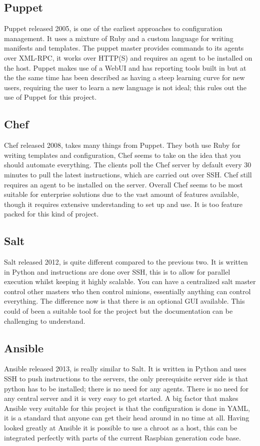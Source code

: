 \documentclass[12pt,a4paper]{report}
\begin{document}
\subsection{Puppet}
Puppet \citep{puppet} released 2005, is one of the earliest approaches to configuration management. It uses a mixture of Ruby and a custom language for writing manifests and templates. The puppet master provides commands to its agents over XML-RPC, it works over HTTP(S) and requires an agent to be installed on the host. Puppet makes use of a WebUI and has reporting tools built in but at the the same time has been described as having a steep learning curve for new users, requiring the user to learn a new language is not ideal; this rules out the use of Puppet for this project. 
\subsection{Chef}
Chef \citep{chef} released 2008, takes many things from Puppet. They both use Ruby for writing templates and configuration, Chef seems to take on the idea that you should automate everything. The clients poll the Chef server by default every 30 minutes to pull the latest instructions, which are carried out over SSH. Chef still requires an agent to be installed on the server. Overall Chef seems to be most suitable for enterprise solutions due to the vast amount of features available, though it requires extensive understanding to set up and use. It is too feature packed for this kind of project.
\subsection{Salt}
Salt \citep{salt} released 2012, is quite different compared to the previous two. It is written in Python and instructions are done over SSH, this is to allow for parallel execution whilst keeping it highly scalable. You can have a centralized salt master control other masters who then control minions, essentially anything can control everything. The difference now is that there is an optional GUI available. This could of been a suitable tool for the project but the documentation can be challenging to understand.
\subsection{Ansible}
Ansible \citep{ansible} released 2013, is really similar to Salt. It is written in Python and uses SSH to push instructions to the servers, the only prerequisite server side is that python has to be installed; there is no need for any agents. There is no need for any central server and it is very easy to get started. A big factor that makes Ansible very suitable for this project is that the configuration is done in YAML, it is a standard that anyone can get their head around in no time at all. Having looked greatly at Ansible it is possible to use a chroot as a host, this can be integrated perfectly with parts of the current Raspbian generation code base.     
\end{document}
